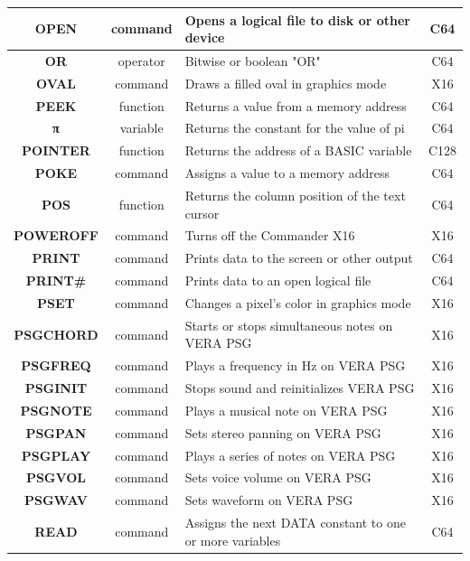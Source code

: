 \begin{longtable}{|c|c|m{4cm}|c|}
	{\bfseries OPEN} & command & Opens a logical file to disk or other device & C64 \\ \hline
	{\bfseries OR} & operator & Bitwise or boolean "OR" & C64 \\ \hline
	{\bfseries OVAL} & command & Draws a filled oval in graphics mode & X16 \\ \hline
	{\bfseries PEEK} & function & Returns a value from a memory address & C64 \\ \hline
	{\ttfamily\bfseries π} & variable & Returns the constant for the value of pi & C64 \\ \hline
	{\bfseries POINTER} & function & Returns the address of a BASIC variable & C128 \\ \hline
	{\bfseries POKE} & command & Assigns a value to a memory address & C64 \\ \hline
	{\bfseries POS} & function & Returns the column position of the text cursor & C64 \\ \hline
	{\bfseries POWEROFF} & command & Turns off the Commander X16 & X16 \\ \hline
	{\bfseries PRINT} & command & Prints data to the screen or other output & C64 \\ \hline
	{\bfseries PRINT\#} & command & Prints data to an open logical file & C64 \\ \hline
	{\bfseries PSET} & command & Changes a pixel's color in graphics mode & X16 \\ \hline
	{\bfseries PSGCHORD} & command & Starts or stops simultaneous notes on VERA PSG & X16 \\ \hline
	{\bfseries PSGFREQ} & command & Plays a frequency in Hz on VERA PSG & X16 \\ \hline
	{\bfseries PSGINIT} & command & Stops sound and reinitializes VERA PSG & X16 \\ \hline
	{\bfseries PSGNOTE} & command & Plays a musical note on VERA PSG & X16 \\ \hline
	{\bfseries PSGPAN} & command & Sets stereo panning on VERA PSG & X16 \\ \hline
	{\bfseries PSGPLAY} & command & Plays a series of notes on VERA PSG & X16 \\ \hline
	{\bfseries PSGVOL} & command & Sets voice volume on VERA PSG & X16 \\ \hline
	{\bfseries PSGWAV} & command & Sets waveform on VERA PSG & X16 \\ \hline
	{\bfseries READ} & command & Assigns the next {\ttfamily DATA} constant to one or more variables & C64 \\ \hline

\end{longtable}
